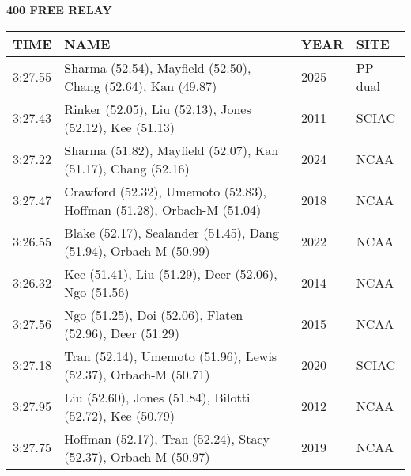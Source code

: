 \begin{center}
\begin{minipage}[t]{0.7\textwidth}
\centering
\textbf{400 FREE RELAY}\\[0.05cm]
\begin{tabular}{@{}p{1.8cm}p{2.8cm}p{1.2cm}p{1.4cm}@{}}
\hline
\textbf{TIME} & \textbf{NAME} & \textbf{YEAR} & \textbf{SITE} \\
\hline
3:27.55 & Sharma (52.54), Mayfield (52.50), Chang (52.64), Kan (49.87) & 2025 & PP dual \\
3:27.43 & Rinker (52.05), Liu (52.13), Jones (52.12), Kee (51.13) & 2011 & SCIAC \\
3:27.22 & Sharma (51.82), Mayfield (52.07), Kan (51.17), Chang (52.16) & 2024 & NCAA \\
3:27.47 & Crawford (52.32), Umemoto (52.83), Hoffman (51.28), Orbach-M (51.04) & 2018 & NCAA \\
3:26.55 & Blake (52.17), Sealander (51.45), Dang (51.94), Orbach-M (50.99) & 2022 & NCAA \\
3:26.32 & Kee (51.41), Liu (51.29), Deer (52.06), Ngo (51.56) & 2014 & NCAA \\
3:27.56 & Ngo (51.25), Doi (52.06), Flaten (52.96), Deer (51.29) & 2015 & NCAA \\
3:27.18 & Tran (52.14), Umemoto (51.96), Lewis (52.37), Orbach-M (50.71) & 2020 & SCIAC \\
3:27.95 & Liu (52.60), Jones (51.84), Bilotti (52.72), Kee (50.79) & 2012 & NCAA \\
3:27.75 & Hoffman (52.17), Tran (52.24), Stacy (52.37), Orbach-M (50.97) & 2019 & NCAA \\
\hline
\end{tabular}
\end{minipage}
\end{center}

\vspace{0.4cm}

